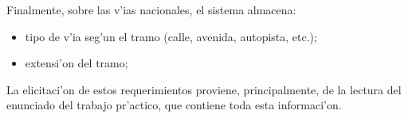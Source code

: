 Finalmente, sobre las v'ias nacionales, el sistema almacena:

\begin{itemize}
\item tipo de v'ia seg'un el tramo (calle, avenida, autopista, etc.);
\item extensi'on del tramo;
\end{itemize}

La elicitaci'on de estos requerimientos proviene, principalmente, de la lectura del enunciado del trabajo pr'actico, que contiene toda esta informaci'on.